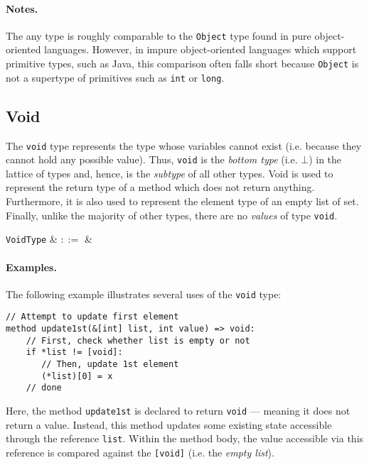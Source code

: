 \paragraph{Notes.}  The any type is roughly comparable to the \lstinline{Object} type found in pure object-oriented languages.  However, in impure object-oriented languages which support primitive types, such as Java, this comparison often falls short because \lstinline{Object} is not a supertype of primitives such as \lstinline{int} or \lstinline{long}.


\subsection{Void}
\label{c_types_void}

The \lstinline{void} type represents the type whose variables cannot exist (i.e. because they cannot hold any possible value).  Thus, \lstinline{void} is the {\em bottom type} (i.e. $\bot$) in the lattice of types and, hence, is the {\em subtype} of all other types.  Void is used to represent the return type of a method which does not return anything.  Furthermore, it is also used to represent the element type of an empty list of set.  Finally, unlike the majority of other types, there are no {\em values} of type \lstinline{void}.

\begin{syntax}
   \verb+VoidType+ & $::=$ &  \\
\end{syntax}

\paragraph{Examples.} The following example illustrates several uses of the \lstinline{void} type:

\begin{lstlisting}
// Attempt to update first element
method update1st(&[int] list, int value) => void:
    // First, check whether list is empty or not
    if *list != [void]:
       // Then, update 1st element
       (*list)[0] = x
    // done
\end{lstlisting}

Here, the method \lstinline{update1st} is declared to return
\lstinline{void} --- meaning it does not return a value.  Instead,
this method updates some existing state accessible through the
reference \lstinline{list}.  Within the method body, the value
accessible via this reference is compared against the
\lstinline{[void]} (i.e. the {\em empty list}).

